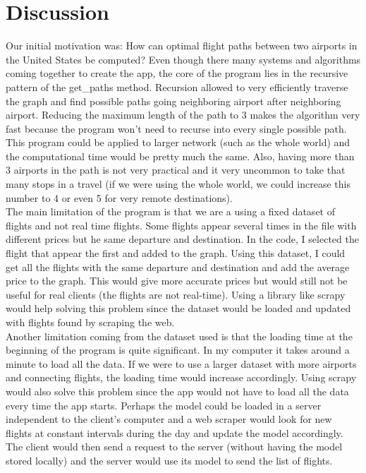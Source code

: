 \documentclass[fontsize=11pt]{article}
\begin{document}
\section*{Discussion}

\noindent
Our initial motivation was: How can optimal flight paths between two airports in the United States be computed? Even though there many systems and algorithms coming together to create the app, the core of the program lies in the recursive pattern of the get\_paths method. Recursion allowed to very efficiently traverse the graph and find possible paths going neighboring airport after neighboring airport.
Reducing the maximum length of the path to 3 makes the algorithm very fast because the program won’t need to recurse into every single possible path. This program could be applied to larger network (such as the whole world) and the computational time would be pretty much the same. Also, having more than 3 airports in the path is not very practical and it very uncommon to take that many stops in a travel (if we were using the whole world, we could increase this number to 4 or even 5 for very remote destinations).\\

\noindent
The main limitation of the program is that we are a using a fixed dataset of flights and not real time flights. Some flights appear several times in the file with different prices but he same departure and destination. In the code, I selected the flight that appear the first and added to the graph. Using this dataset, I could get all the flights with the same departure and destination and add the average price to the graph. This would give more accurate prices but would still not be useful for real clients (the flights are not real-time). 
Using a library like scrapy would help solving this problem since the dataset would be loaded and updated with flights found by scraping the web.\\
Another limitation coming from the dataset used is that the loading time at the beginning of the program is quite significant. In my computer it takes around a minute to load all the data. If we were to use a larger dataset with more airports and connecting flights, the loading time would increase accordingly. Using scrapy would also solve this problem since the app would not have to load all the data every time the app starts. Perhaps the model could be loaded in a server independent to the client’s computer and a web scraper would look for new flights at constant intervals during the day and update the model accordingly. The client would then send a request to the server (without having the model stored locally) and the server would use its model to send the list of flights.\\
\end{document}
